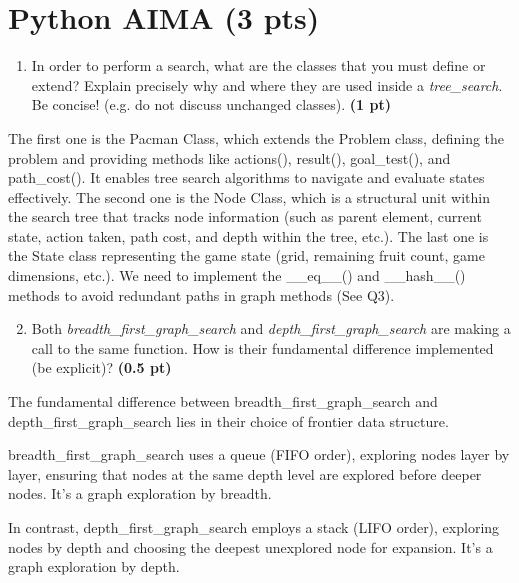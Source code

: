 \documentclass[11pt,a4paper]{../template/report}
\begin{document}
\maketitle

\section{Python AIMA (3 pts)}

\begin{enumerate}
  \item In order to perform a search, what are the classes that you must define or extend? Explain precisely why and where they are used inside a \textit{tree\_search}. Be concise! (e.g. do not discuss unchanged classes). \textbf{(1 pt)}
\end{enumerate}

\begin{answer}
The first one is the Pacman Class, which extends the Problem class, defining the problem and providing methods like actions(), result(), goal\_test(), and path\_cost(). It enables tree search algorithms to navigate and evaluate states effectively.
The second one is the Node Class, which is a structural unit within the search tree that tracks node information (such as parent element, current state, action taken, path cost, and depth within the tree, etc.).
The last one is the State class representing the game state (grid, remaining fruit count, game dimensions, etc.). We need to implement the \_\_eq\_\_() and \_\_hash\_\_() methods to avoid redundant paths in graph methods (See Q3).
\end{answer}



\begin{enumerate}
\setcounter{enumi}{1}
    \item Both \textit{breadth\_first\_graph\_search} and \textit{depth\_first\_graph\_search} are making a call to the same function. How is their fundamental difference implemented (be explicit)? \textbf{(0.5 pt)}
\end{enumerate}

\begin{answer}
The fundamental difference between breadth\_first\_graph\_search and depth\_first\_graph\_search lies in their choice of frontier data structure.

breadth\_first\_graph\_search uses a queue (FIFO order), exploring nodes layer by layer, ensuring that nodes at the same depth level are explored before deeper nodes. It's a graph exploration by breadth.

In contrast, depth\_first\_graph\_search employs a stack (LIFO order), exploring nodes by depth and choosing the deepest unexplored node for expansion. It's a graph exploration by depth.
\end{answer}
\end{document}
